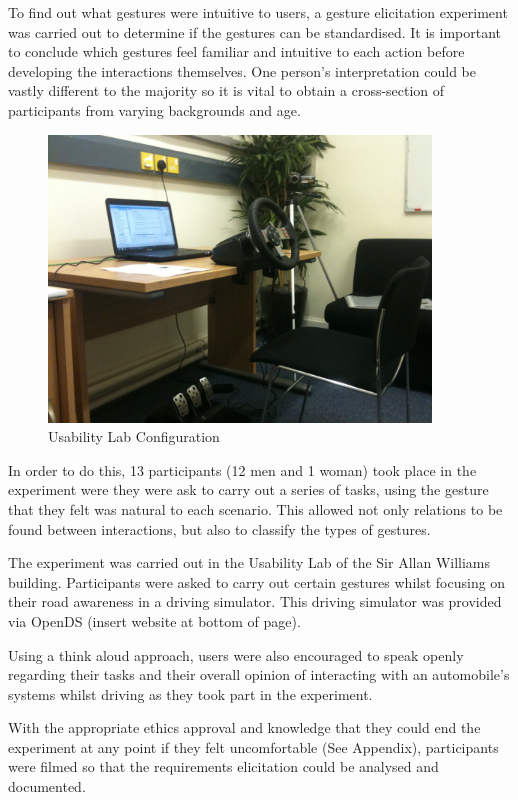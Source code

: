 \documentclass{l4proj}
\begin{document}
To find out what gestures were intuitive to users, a gesture elicitation experiment was carried out to determine if the gestures can be standardised. It is important to conclude which gestures feel familiar and intuitive to each action before developing the interactions themselves. One person’s interpretation could be vastly different to the majority so it is vital to obtain a cross-section of participants from varying backgrounds and age.

\begin{figure}[h!]
\centering
\includegraphics[width=4in]{images/Requirements.jpg}
\caption{Usability Lab Configuration}
\label{fig:sawb}
\end{figure}

In order to do this, 13 participants (12 men and 1 woman) took place in the experiment were they were ask to carry out a series of tasks, using the gesture that they felt was natural to each scenario. This allowed not only relations to be found between interactions, but also to classify the types of gestures.

The experiment was carried out in the Usability Lab of the Sir Allan Williams building. Participants were asked to carry out certain gestures whilst focusing on their road awareness in a driving simulator. This driving simulator was provided via OpenDS (insert website at bottom of page).

Using a think aloud approach, users were also encouraged to speak openly regarding their tasks and their overall opinion of interacting with an automobile’s systems whilst driving as they took part in the experiment.

With the appropriate ethics approval and knowledge that they could end the experiment at any point if they felt uncomfortable (See Appendix), participants were filmed so that the requirements elicitation could be analysed and documented.
\end{document}
